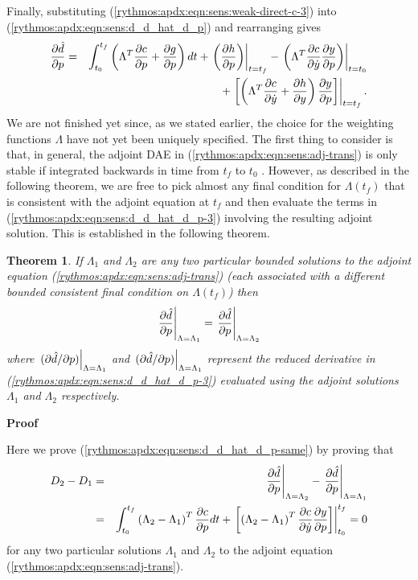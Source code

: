 \documentclass[pdf,ps2pdf,11pt]{SANDreport}
\newtheorem{theorem}{Theorem}
\begin{document}
Finally, substituting (\ref{rythmos:apdx:eqn:sens:weak-direct-c-3}) into
(\ref{rythmos:apdx:eqn:sens:d_d_hat_d_p}) and rearranging gives
%
\begin{eqnarray}
\displaystyle{\frac{\partial \hat{d}}{\partial p}} 
& = & \int_{t_0}^{t_f} \left( \Lambda^T \displaystyle{\frac{\partial c}{\partial p}} + \displaystyle{\frac{\partial g}{\partial p}} \right) dt
  + \left. \left( \displaystyle{\frac{\partial h}{\partial p}} \right) \right|_{t=t_f}
  - \left. \left( \Lambda^T \displaystyle{\frac{\partial c}{\partial \dot{y}}} \displaystyle{\frac{\partial y}{\partial p}} \right) \right|_{t=t_0}
\nonumber \\
& & + \left. \left[ \left(
    \Lambda^T \displaystyle{\frac{\partial c}{\partial \dot{y}}}
    +  \displaystyle{\frac{\partial h}{\partial y}}
  \right)  \displaystyle{\frac{\partial y}{\partial p}} \right] \right|_{t=t_f}.
\label{rythmos:apdx:eqn:sens:d_d_hat_d_p-3}
\end{eqnarray}
%
We are not finished yet since, as we stated earlier, the choice for the
weighting functions $\Lambda$ have not yet been uniquely specified.  The first
thing to consider is that, in general, the adjoint DAE in
(\ref{rythmos:apdx:eqn:sens:adj-trans}) is only stable if integrated backwards
in time from $t_f$ to $t_0$ {}\cite{adjoint-sens-2003}.  However, as described
in the following theorem, we are free to pick almost any final condition for
$\Lambda(t_f)$ that is consistent with the adjoint equation at $t_f$ and then
evaluate the terms in (\ref{rythmos:apdx:eqn:sens:d_d_hat_d_p-3}) involving
the resulting adjoint solution.  This is established in the following theorem.

\begin{theorem}
If $\Lambda_1$ and $\Lambda_2$ are any two particular bounded solutions to the
adjoint equation (\ref{rythmos:apdx:eqn:sens:adj-trans}) (each associated with
a different bounded consistent final condition on $\Lambda(t_f)$) then
%
\begin{equation}
\left.\displaystyle{\frac{\partial \hat{d}}{\partial p}}\right|_{\Lambda=\Lambda_1} = \left.\displaystyle{\frac{\partial \hat{d}}{\partial p}}\right|_{\Lambda=\Lambda_2}
\label{rythmos:apdx:eqn:sens:d_d_hat_d_p-same}
\end{equation}
%
where $\left.(\partial \hat{d} / \partial p)\right|_{\Lambda=\Lambda_1}$ and
$\left.(\partial \hat{d} / \partial p)\right|_{\Lambda=\Lambda_1}$ represent the reduced
derivative in (\ref{rythmos:apdx:eqn:sens:d_d_hat_d_p-3}) evaluated using the
adjoint solutions $\Lambda_1$ and $\Lambda_2$ respectively.
\end{theorem}

\textbf{Proof}

Here we prove (\ref{rythmos:apdx:eqn:sens:d_d_hat_d_p-same}) by proving that
%
\begin{eqnarray}
D_2 - D_1
& = &
\left.\displaystyle{\frac{\partial \hat{d}}{\partial p}}\right|_{\Lambda=\Lambda_2} - \left.\displaystyle{\frac{\partial \hat{d}}{\partial p}}\right|_{\Lambda=\Lambda_1}
\nonumber \\
& = &
\int_{t_0}^{t_f} \left( \Lambda_2 - \Lambda_1 \right)^T \displaystyle{\frac{\partial c}{\partial p}} dt
+ \left.\left[ \left( \Lambda_2 - \Lambda_1 \right)^T \displaystyle{\frac{\partial c}{\partial \dot{y}}} \displaystyle{\frac{\partial y}{\partial p}} \right]\right|_{t_0}^{t_f}
= 0
\label{rythmos:apdx:eqn:sens:ta:d_hat_d_d_p-diff-zero}
\end{eqnarray}
%
for any two particular solutions $\Lambda_1$ and $\Lambda_2$ to the adjoint
equation (\ref{rythmos:apdx:eqn:sens:adj-trans}).
\end{document}
